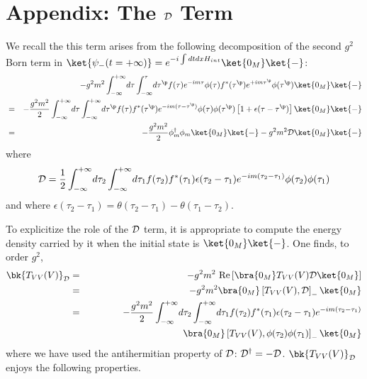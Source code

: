 \documentclass[12pt]{article}
\begin{document}
\section{Appendix: The $\cal{D}$ Term}\label{app}


We recall the this term arises from the following
decomposition of the second $g^2$ Born term in
$\ket{\psi_-(t=+\infty)}=e^{-i \int dt dx H_{int}}\ket{0_M} \ket{-}$:
\begin{eqnarray}
& & - g^2 m^2
\int_{-\infty}^{+\infty}\!
d\tau
\int_{-\infty}^{\tau}\!
d\tau^\p f(\tau) e^{-im\tau}  \phi(\tau)
  f^*(\tau^\p) e^{+im\tau^\p}  \phi(\tau^\p)\ket{0_M}
\ket{-}\nonumber \\
&=& - {g^2 m^2 \over 2}
\int_{-\infty}^{+\infty}\!
d\tau
\int_{-\infty}^{+\infty}\!
d\tau^\p f(\tau)f^*(\tau^\p)
e^{-im(\tau-\tau^\p)} \phi(\tau) \phi(\tau^\p)
\left[ 1 + \epsilon(\tau - \tau^\p)\right]
\ket{0_M}
\ket{-}\nonumber \\
&=& -{g^2 m^2\over 2}
\phi_m^\dagger \phi_m \ket{0_M}\ket{-}
-  g^2 m^2
{\cal D}  \ket{0_M}\ket{-}
\label{stateA}
\end{eqnarray}
where
\begin{equation}
{\cal D} = {1 \over 2}
\int_{-\infty}^{+\infty}\!  d\tau_2
\int_{-\infty}^{+\infty}\!
  d \tau_1 f(\tau_2) f^*(\tau_1)
\epsilon(\tau_2 - \tau_1) e^{-i m( \tau_2- \tau_1)}
\phi(\tau_2) \phi(\tau_1)
\label{calDA}
\end{equation}
and where $\epsilon(\tau_2 - \tau_1) = \theta(\tau_2 - \tau_1) -
\theta(\tau_1 - \tau_2 )$.

To explicitize the role of the ${\cal D}$ term, it is appropriate
to compute the energy density carried by it when the initial state is
$\ket{0_M}\ket{-}$.
One finds, to  order $g^2$,
\begin{eqnarray}
\bk{T_{VV}(V)}_{{\cal D}}&=&  -g^2 m^2
\mbox{ Re}\left[ \bra{0_M} T_{VV}(V) {\cal D} \ket{0_M}\right]
\nonumber \\
&=&  -g^2 m^2
 \bra{0_M} \left[ T_{VV}(V),{\cal D}\right]_- \ket{0_M}
\nonumber \\
&=& - {g^2 m^2 \over 2}
\int_{-\infty}^{+\infty} \! d\tau_2
\int_{-\infty}^{+\infty} \! d \tau_1
f(\tau_2)  f^*(\tau_1)
\epsilon(\tau_2 - \tau_1)
 e^{-i m( \tau_2- \tau_1)}
\nonumber \\
& &\quad \quad \quad \quad \quad \quad \quad \quad \quad \quad
\bra{0_M} \left[T_{VV}(V), \phi(\tau_2)\phi(\tau_1) \right]_- \ket{0_M}
\label{Comm}
\end{eqnarray}
where we have used the antihermitian property of ${\cal D}$:
${\cal D}^\dagger =
-{\cal D}$.
$\bk{T_{VV}(V)}_{{\cal D}}$ enjoys the following properties.
\end{document}
